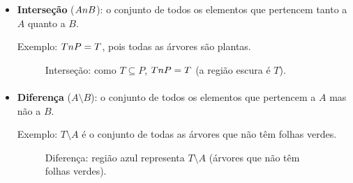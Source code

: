 \documentclass[12pt,a4paper]{article}
\def\cap{\string n}%
\begin{document}
\begin{itemize}
          \paragraph{}
    \item \textbf{Interseção} (\(A \cap B\)): o conjunto de todos os elementos que pertencem tanto a \(A\) quanto a \(B\).

          Exemplo: \(T \cap P = T\), pois todas as árvores são plantas.
          \begin{figure}[H]
              \centering
              \caption{Interseção: como $T \subseteq P$, $T \cap P = T$ (a região escura é $T$).}
              \label{fig:op-intersecao}
          \end{figure}

          \paragraph{}
    \item \textbf{Diferença} (\(A \setminus B\)): o conjunto de todos os elementos que pertencem a \(A\) mas não a \(B\).

          Exemplo: \(T \setminus A\) é o conjunto de todas as árvores que não têm folhas verdes.
          \begin{figure}[H]
              \centering
              \caption{Diferença: região azul representa $T \setminus A$ (árvores que não têm folhas verdes).}
              \label{fig:op-diferenca}
          \end{figure}


\end{itemize}
\end{document}
